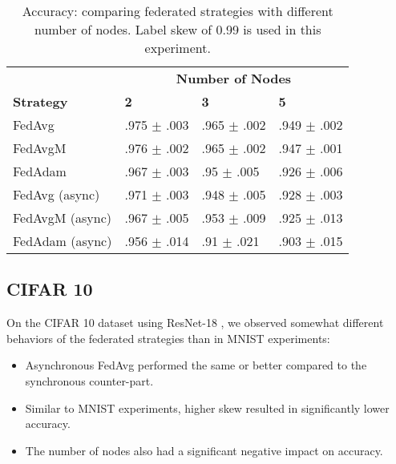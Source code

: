 \documentclass[twocolumn, switch]{article} %
\begin{document}
\begin{table}[ht]
    \centering
    \begin{tabular}{l|lll}
    \toprule
    & \multicolumn{3}{c}{\textbf{Number of Nodes}} \\
    \textbf{Strategy} & \textbf{2} & \textbf{3} & \textbf{5}  \\
    \midrule
    
    FedAvg & .975 $\pm$ .003 & .965 $\pm$ .002 & .949 $\pm$ .002 \\
    FedAvgM & .976 $\pm$ .002 & .965 $\pm$ .002 & .947 $\pm$ .001 \\
    FedAdam & .967 $\pm$ .003 & .95 $\pm$ .005 & .926 $\pm$ .006 \\
    \midrule
    FedAvg (async) & .971 $\pm$ .003 & .948 $\pm$ .005 & .928 $\pm$ .003 \\
    FedAvgM (async) & .967 $\pm$ .005 & .953 $\pm$ .009 & .925 $\pm$ .013 \\
    FedAdam (async) & .956 $\pm$ .014 & .91 $\pm$ .021 & .903 $\pm$ .015 \\
    \bottomrule
    \end{tabular}
    \vspace{5pt}
    \caption{Accuracy: comparing federated strategies with different number of nodes. Label skew of 0.99 is used in this experiment.}
    \label{tab:mnist-0.99}
\end{table}




\subsection{CIFAR 10}

On the CIFAR 10 dataset using ResNet-18 \cite{resnet}, we observed somewhat different behaviors of the federated strategies than in MNIST experiments:

\begin{itemize}
    \item Asynchronous FedAvg performed the same or better compared to the synchronous counter-part.
    \item Similar to MNIST experiments, higher skew resulted in significantly lower accuracy.
    \item The number of nodes also had a significant negative impact on accuracy.
\end{itemize}
\end{document}

